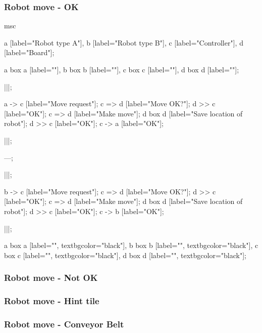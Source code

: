 	\subsubsection{Robot move - OK}
	\begin{msc}
		msc
		{

		a [label="Robot type A"],
		b [label="Robot type B"],
		c [label="Controller"],
		d [label="Board"];

		a box a [label=""],
		b box b [label=""],
		c box c [label=""],
		d box d [label=""];

		|||;

		a -> c [label="Move request"];
		c => d [label="Move OK?"];
		d >> c [label="OK"];
		c => d [label="Make move"];
		d box d [label="Save location of robot"];
		d >> c [label="OK"];
		c -> a [label="OK"];

		|||;

		---;

		|||;

		b -> c [label="Move request"];
		c => d [label="Move OK?"];
		d >> c [label="OK"];
		c => d [label="Make move"];
		d box d [label="Save location of robot"];
		d >> c [label="OK"];
		c -> b [label="OK"];

		|||;

		a box a [label="", textbgcolor="black"],
		b box b [label="", textbgcolor="black"],
		c box c [label="", textbgcolor="black"],
		d box d [label="", textbgcolor="black"];

		}
	\end{msc}
	
	\subsubsection{Robot move - Not OK}
	\begin{msc}
		
	\end{msc}
	
	\subsubsection{Robot move - Hint tile}
	\begin{msc}
		
	\end{msc}
	
	\subsubsection{Robot move - Conveyor Belt}
	\begin{msc}
		
	\end{msc}
	
